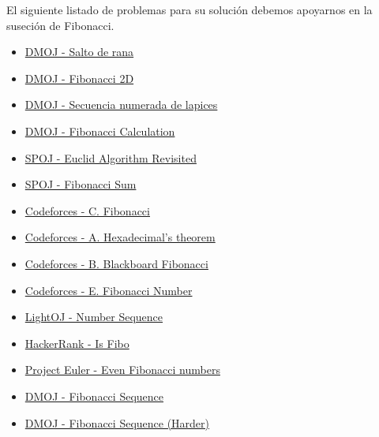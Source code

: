 El siguiente listado de problemas para su solución debemos apoyarnos en la suseción de Fibonacci.

\begin{itemize}
	\item \href{https://dmoj.uclv.edu.cu/problem/frog}{DMOJ - Salto de rana}
	\item \href{https://dmoj.uclv.edu.cu/problem/fibonacci}{DMOJ - Fibonacci 2D}
	\item \href{https://dmoj.uclv.edu.cu/problem/secnum}{DMOJ - Secuencia numerada de lapices}
	\item \href{https://dmoj.uclv.edu.cu/problem/fibonaccicalculatio}{DMOJ - Fibonacci Calculation}
	\item \href{http://www.spoj.com/problems/MAIN74/}{SPOJ - Euclid Algorithm Revisited}
	\item \href{http://www.spoj.com/problems/FIBOSUM/}{SPOJ - Fibonacci Sum}
	\item \href{https://codeforces.com/problemset/gymProblem/102644/C}{Codeforces - C. Fibonacci}
	\item \href{https://codeforces.com/problemset/problem/199/A}{Codeforces - A. Hexadecimal's theorem}
	\item \href{https://codeforces.com/problemset/problem/217/B}{Codeforces - B. Blackboard Fibonacci}
	\item \href{https://codeforces.com/problemset/problem/193/E}{Codeforces - E. Fibonacci Number}
	\item \href{https://lightoj.com/problem/number-sequence}{LightOJ - Number Sequence}
	\item \href{https://www.hackerrank.com/challenges/is-fibo/problem}{HackerRank - Is Fibo}
	\item \href{https://www.hackerrank.com/contests/projecteuler/challenges/euler002/problem}{Project Euler - Even Fibonacci numbers}
	\item \href{https://dmoj.ca/problem/fibonacci}{DMOJ - Fibonacci Sequence}
	\item \href{https://dmoj.ca/problem/fibonacci2}{DMOJ - Fibonacci Sequence (Harder)}
\end{itemize}